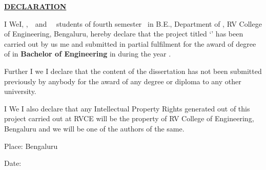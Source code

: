 
\thispagestyle{empty}

\begin{center}
  \Large\textbf{\underline{DECLARATION}} \par
\end{center}


\noindent \ifPG I \else \ifStuNameBUsed We\else I\fi\fi, \textbf{\printStuNameA}
\textbf{\printStuNameB} \ifStuNameCUsed  \ifStuNameDUsed ,$\,$ \fi 
\textbf{\printStuNameC}$\,$ \ifStuNameDUsed and $\,$ \textbf{\printStuNameD}$\,$ \fi \fi 
 students of \ifPG fourth \else {}\fi \fi semester 
 \ifPG \printMastersInSF\, in \printMastersPrgName \else B.E.\fi, Department of \printDepartmentLF,
  RV College of Engineering, Bengaluru, hereby declare that the \fi 
  project titled `\textbf{\printTitle}' has been carried out by \ifStuNameBUsed us \else me \fi and 
  submitted in partial fulfilment for the award of degree of \ifPG \textbf{\printMastersInLF} in 
  \textbf{\printMastersPrgName} \else\textbf{Bachelor of Engineering} in \textbf{\printDepartmentLF} 
  \fi during the year \printAcadYear.\\ \par
\noindent Further \ifPG I \else\ifStuNameBUsed we \else I \fi \fi 
declare that the content of the dissertation has not been submitted previously 
by anybody for the award of any degree or diploma to any other university.\\ \par

\noindent \ifPG I \else\ifStuNameBUsed We \else I \fi \fi also declare that any 
Intellectual Property Rights generated out of this project carried out at RVCE 
will be the property of RV College of Engineering, Bengaluru and we will be one 
of the authors of the same.

\vspace{1cm}
\noindent Place: Bengaluru\par
\vspace{0.5cm}
\noindent Date: \par

